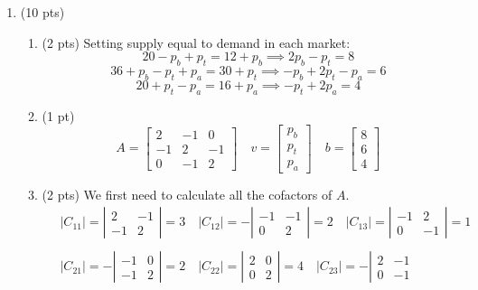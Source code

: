 \documentclass{./../../latex/tests}
\begin{document}
\begin{enumerate}
\item (10 pts)
\begin{enumerate}
\item (2 pts) Setting supply equal to demand in each market:
\[ 20 - p_b + p_t = 12 + p_b \implies 2p_b - p_t = 8 \]
\[ 36 + p_b - p_t + p_a = 30 + p_t \implies -p_b + 2p_t - p_a = 6 \]
\[ 20 + p_t - p_a = 16 + p_a \implies -p_t + 2p_a = 4 \]
\item (1 pt)
\[ A=\left[\begin{array}{rrr}2 & -1 & 0 \\ -1 & 2 & -1 \\ 0 & -1 & 2\end{array}\right] \quad v=\left[\begin{array}{l}p_b \\ p_t \\ p_a\end{array}\right] \quad b=\left[\begin{array}{c}8 \\ 6 \\ 4\end{array}\right] \]
\item (2 pts) We first need to calculate all the cofactors of $A$.
\[
\begin{aligned}
&\left|C_{11}\right|=\left|\begin{array}{rr}
2 & -1 \\
-1 & 2
\end{array}\right|=3 \quad \left|C_{12}\right|=-\left|\begin{array}{rr}
-1 & -1 \\
0 & 2
\end{array}\right|=2 \quad \left|C_{13}\right|=\left|\begin{array}{rr}
-1 & 2 \\
0 & -1
\end{array}\right|=1 \\~\\
&\left|C_{21}\right|=-\left|\begin{array}{rr}
-1 & 0 \\
-1 & 2
\end{array}\right|=2 \quad \left|C_{22}\right|=\left|\begin{array}{rr}
2 & 0 \\
0 & 2
\end{array}\right|=4 \quad \left|C_{23}\right|=-\left|\begin{array}{rr}
2 & -1 \\
0 & -1

\end{array}
\end{aligned}\]
\end{enumerate}
\end{enumerate}
\end{document}
